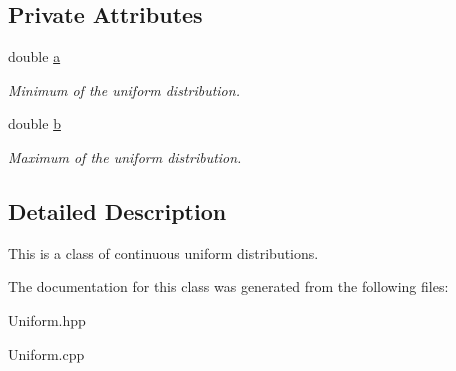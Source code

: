 \subsection*{Private Attributes}
\begin{DoxyCompactItemize}
\item 
\mbox{\label{class_uniform_a7264c2617a82aaaf04b17fc3911368b9}} 
double \hyperlink{class_uniform_a7264c2617a82aaaf04b17fc3911368b9}{a}
\begin{DoxyCompactList}\small\item\em Minimum of the uniform distribution. \end{DoxyCompactList}\item 
\mbox{\label{class_uniform_a6d556bd18b80242b58adfde0dd12e319}} 
double \hyperlink{class_uniform_a6d556bd18b80242b58adfde0dd12e319}{b}
\begin{DoxyCompactList}\small\item\em Maximum of the uniform distribution. \end{DoxyCompactList}\end{DoxyCompactItemize}


\subsection{Detailed Description}
This is a class of continuous uniform distributions. 

The documentation for this class was generated from the following files\+:\begin{DoxyCompactItemize}
\item 
Uniform.\+hpp\item 
Uniform.\+cpp\end{DoxyCompactItemize}
